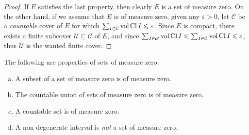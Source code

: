 \begin{proof}
    If \(E\) satisfies the last property, then clearly \(E\) is a set of measure
    zero. On the other hand, if we assume that \(E\) is of measure zero, given any
    \(\varepsilon > 0\), let \(\mathcal C\) be a \emph{countable} cover of \(E\) for
    which \(\sum_{I \in \mathcal C} \operatorname{vol} \operatorname{Cl} I \leqslant \varepsilon\). Since
    \(E\) is compact, there exists a finite subcover \(\mathcal U \subseteq \mathcal
    C\) of \(E\), and since \(\sum_{I \in \mathcal U} \operatorname{vol} \operatorname{Cl} I \leqslant \sum_{I
        \in \mathcal C} \operatorname{vol} \operatorname{Cl} I \leqslant \varepsilon\), thus \(\mathcal U\) is the
    wanted finite cover.
\end{proof}

\begin{lemma}
    \label{lem:measure-zero-properties}
    The following are properties of sets of measure zero:
    \begin{enumerate}[(a)]\setlength\itemsep{0em}
        \item A subset of a set of measure zero is of measure zero.
        \item The countable union of sets of measure zero is of measure zero.
        \item A countable set is of measure zero.
        \item A non-degenerate interval is \emph{not} a set of measure zero.
    \end{enumerate}
\end{lemma}

